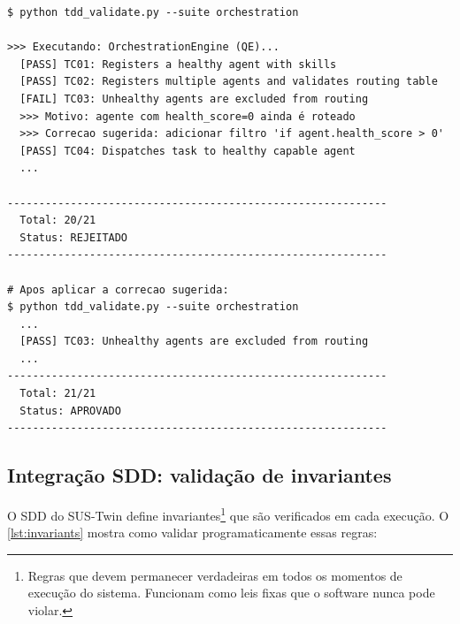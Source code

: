 \begin{lstlisting}[style=bashstyle, caption={Exemplo de saída do validador
com falha e correção}, label={lst:tdd-output-example}]
$ python tdd_validate.py --suite orchestration

>>> Executando: OrchestrationEngine (QE)...
  [PASS] TC01: Registers a healthy agent with skills
  [PASS] TC02: Registers multiple agents and validates routing table
  [FAIL] TC03: Unhealthy agents are excluded from routing
  >>> Motivo: agente com health_score=0 ainda é roteado
  >>> Correcao sugerida: adicionar filtro 'if agent.health_score > 0'
  [PASS] TC04: Dispatches task to healthy capable agent
  ...

------------------------------------------------------------
  Total: 20/21
  Status: REJEITADO
------------------------------------------------------------

# Apos aplicar a correcao sugerida:
$ python tdd_validate.py --suite orchestration
  ...
  [PASS] TC03: Unhealthy agents are excluded from routing
  ...
------------------------------------------------------------
  Total: 21/21
  Status: APROVADO
------------------------------------------------------------
\end{lstlisting}

\subsection{Integração SDD: validação de invariantes}

O SDD do SUS-Twin define invariantes\footnote{Regras que devem permanecer
verdadeiras em todos os momentos de execução do sistema. Funcionam como leis
fixas que o software nunca pode violar.} que são verificados em cada execução.
O \autoref{lst:invariants} mostra como validar programaticamente essas regras:

